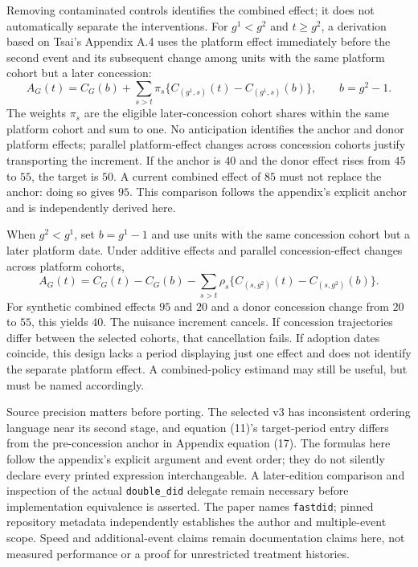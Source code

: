 Removing contaminated controls identifies the combined effect; it does not automatically separate the interventions.
For $g^1<g^2$ and $t\geq g^2$, a derivation based on Tsai's Appendix A.4 uses the platform effect immediately before the
second event and its subsequent change among units with the same platform cohort but a later concession:
\[
 A_G(t)=C_G(b)+\sum_{s>t}\pi_s\{C_{(g^1,s)}(t)-C_{(g^1,s)}(b)\},\qquad b=g^2-1.
\]
The weights $\pi_s$ are the eligible later-concession cohort shares within the same platform cohort and sum to one.
No anticipation identifies the anchor and donor platform effects; parallel platform-effect changes across concession
cohorts justify transporting the increment. If the anchor is $40$ and the donor effect rises from $45$ to $55$, the
target is $50$. A current combined effect of $85$ must not replace the anchor: doing so gives $95$.
This comparison follows the appendix's explicit anchor and is independently derived here.~\citep{exec28_panel_tsai,exec28_panel_reference}

When $g^2<g^1$, set $b=g^1-1$ and use units with the same concession cohort but a later platform date. Under additive
effects and parallel concession-effect changes across platform cohorts,
\[
 A_G(t)=C_G(t)-C_G(b)-\sum_{s>t}\rho_s\{C_{(s,g^2)}(t)-C_{(s,g^2)}(b)\}.
\]
For synthetic combined effects $95$ and $20$ and a donor concession change from $20$ to $55$, this yields $40$.
The nuisance increment cancels. If concession trajectories differ between the selected cohorts, that cancellation fails.
If adoption dates coincide, this design lacks a period displaying just one effect and does not identify the separate
platform effect. A combined-policy estimand may still be useful, but must be named accordingly.~\citep{exec28_panel_tsai,exec28_panel_reference}

Source precision matters before porting. The selected v3 has inconsistent ordering language near its second stage, and
equation (11)'s target-period entry differs from the pre-concession anchor in Appendix equation (17).
The formulas here follow the appendix's explicit argument and event order; they do not silently declare every printed
expression interchangeable. A later-edition comparison and inspection of the actual \texttt{double\_did} delegate remain
necessary before implementation equivalence is asserted. The paper names \texttt{fastdid}; pinned repository metadata
independently establishes the author and multiple-event scope. Speed and additional-event claims remain documentation
claims here, not measured performance or a proof for unrestricted treatment histories.~\citep{exec28_panel_tsai,exec28_panel_software}


